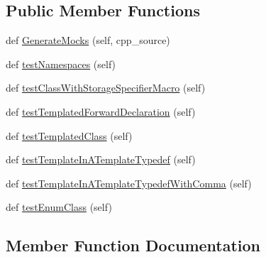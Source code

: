 \subsection*{Public Member Functions}
\begin{DoxyCompactItemize}
\item 
def \mbox{\hyperlink{classscripts_1_1generator_1_1cpp_1_1gmock__class__test_1_1_generate_mocks_test_a734d7e7b660fc7979737a73fe417697a}{Generate\+Mocks}} (self, cpp\+\_\+source)
\item 
def \mbox{\hyperlink{classscripts_1_1generator_1_1cpp_1_1gmock__class__test_1_1_generate_mocks_test_a3c3c2010eafc3fa951ccf2c61ef1fad1}{test\+Namespaces}} (self)
\item 
def \mbox{\hyperlink{classscripts_1_1generator_1_1cpp_1_1gmock__class__test_1_1_generate_mocks_test_af59f528d7bdabd53566bb20f9f596c7d}{test\+Class\+With\+Storage\+Specifier\+Macro}} (self)
\item 
def \mbox{\hyperlink{classscripts_1_1generator_1_1cpp_1_1gmock__class__test_1_1_generate_mocks_test_a2f50b6e29e4ccbe7498ee4152581c178}{test\+Templated\+Forward\+Declaration}} (self)
\item 
def \mbox{\hyperlink{classscripts_1_1generator_1_1cpp_1_1gmock__class__test_1_1_generate_mocks_test_acb687c7f3005656ef5cdc71dccea4cfa}{test\+Templated\+Class}} (self)
\item 
def \mbox{\hyperlink{classscripts_1_1generator_1_1cpp_1_1gmock__class__test_1_1_generate_mocks_test_a04607be12d69d75ac8d0ac3aab52a88f}{test\+Template\+In\+A\+Template\+Typedef}} (self)
\item 
def \mbox{\hyperlink{classscripts_1_1generator_1_1cpp_1_1gmock__class__test_1_1_generate_mocks_test_aadc81810a95fbab57a3f885143632374}{test\+Template\+In\+A\+Template\+Typedef\+With\+Comma}} (self)
\item 
def \mbox{\hyperlink{classscripts_1_1generator_1_1cpp_1_1gmock__class__test_1_1_generate_mocks_test_ab530aa425ac525313a529bbd965009bd}{test\+Enum\+Class}} (self)
\end{DoxyCompactItemize}


\subsection{Member Function Documentation}
\mbox{\label{classscripts_1_1generator_1_1cpp_1_1gmock__class__test_1_1_generate_mocks_test_a734d7e7b660fc7979737a73fe417697a}} 
